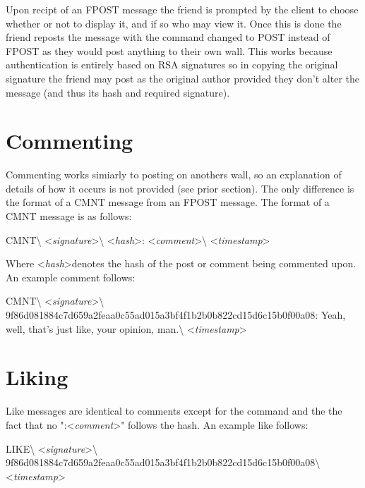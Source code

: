 Upon recipt of an FPOST message the friend is prompted by the client to choose
whether or not to display it, and if so who may view it. Once this is done the
friend reposts the message with the command changed to POST instead of FPOST as
they would post anything to their own wall. This works because authentication is
entirely based on RSA signatures so in copying the original signature the friend
may post as the original author provided they don't alter the message (and thus
its hash and required signature).

\section{Commenting}
Commenting works simiarly to posting on anothers wall, so an explanation of
details of how it occurs is not provided (see prior section). The only
difference is the format of a CMNT message from an FPOST message. The format of
a CMNT message is as follows:

\begin{center}
CMNT\textbackslash
\textless \textit{signature}\textgreater\textbackslash
\textless \textit{hash}\textgreater:
\textless \textit{comment}\textgreater\textbackslash
\textless \textit{timestamp}\textgreater
\end{center}

Where \textless \textit{hash}\textgreater denotes the hash of the post or
comment being commented upon. An example comment follows:

\begin{center}
CMNT\textbackslash
\textless \textit{signature}\textgreater\textbackslash
9f86d081884c7d659a2feaa0c55ad015a3bf4f1b2b0b822cd15d6c15b0f00a08:
Yeah, well, that's just like, your opinion, man.\textbackslash
\textless \textit{timestamp}\textgreater
\end{center}

\section{Liking}
Like messages are identical to comments except for the command and the the fact
that no ":\textless \textit{comment}\textgreater" follows the hash. An example
like follows:

\begin{center}
LIKE\textbackslash
\textless \textit{signature}\textgreater\textbackslash
9f86d081884c7d659a2feaa0c55ad015a3bf4f1b2b0b822cd15d6c15b0f00a08\textbackslash
\textless \textit{timestamp}\textgreater
\end{center}
